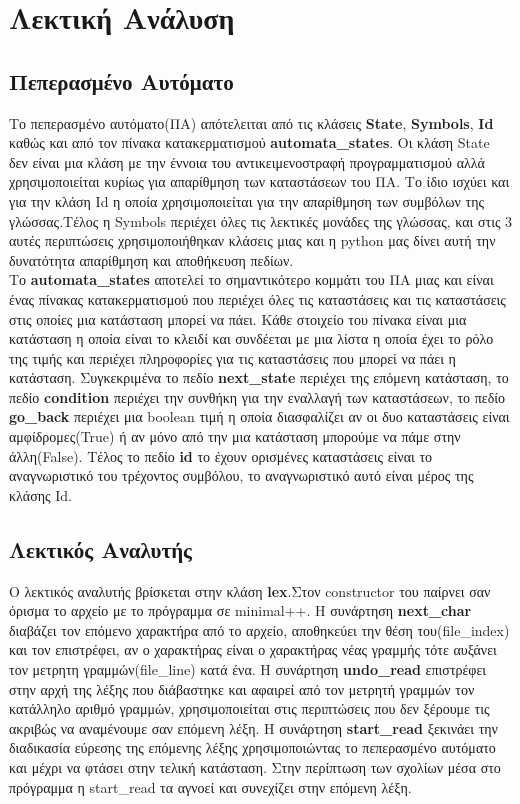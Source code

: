 \documentclass[12pt,a4paper,a4paper]{report}
\begin{document}
\chapter{Λεκτική Ανάλυση}
\section{Πεπερασμένο Αυτόματο}
Το πεπερασμένο αυτόματο(ΠΑ) απότελειται από τις κλάσεις \textbf{State}, \textbf{Symbols}, \textbf{Id} καθώς και από τον  πίνακα κατακερματισμού \newline \textbf{automata\_states}. Oι κλάση State δεν είναι μια κλάση με την έννοια του αντικειμενοστραφή προγραμματισμού αλλά χρησιμοποιείται κυρίως για απαρίθμηση των καταστάσεων του ΠΑ. Το ίδιο ισχύει και για την κλάση Id  η οποία χρησιμοποιείται για την απαρίθμηση των συμβόλων της γλώσσας.Τέλος η Symbols περιέχει όλες τις λεκτικές μονάδες της γλώσσας, και στις 3 αυτές περιπτώσεις χρησιμοποιήθηκαν κλάσεις μιας και η python μας δίνει αυτή την δυνατότητα απαρίθμηση και αποθήκευση πεδίων.\\
Το \textbf{automata\_states} αποτελεί το σημαντικότερο κομμάτι του ΠΑ μιας και είναι ένας πίνακας κατακερματισμού που περιέχει όλες τις καταστάσεις και τις καταστάσεις στις οποίες μια κατάσταση μπορεί να πάει. Κάθε στοιχείο του πίνακα είναι μια κατάσταση η οποία είναι το κλειδί και συνδέεται με μια λίστα η οποία έχει το ρόλο της τιμής και περιέχει πληροφορίες για τις καταστάσεις που μπορεί να πάει η κατάσταση. Συγκεκριμένα το πεδίο \textbf{next\_state} περιέχει της επόμενη κατάσταση, το πεδίο \textbf{condition} περιέχει την συνθήκη για την εναλλαγή των καταστάσεων, το πεδίο \textbf{go\_back} περιέχει μια boolean τιμή η οποία διασφαλίζει αν  οι δυο καταστάσεις είναι αμφίδρομες(True)  ή αν μόνο από την μια κατάσταση μπορούμε να πάμε στην άλλη(False). Tέλος το πεδίο \textbf{id} το έχουν  ορισμένες καταστάσεις είναι το αναγνωριστικό του τρέχοντος συμβόλου, το αναγνωριστικό αυτό είναι μέρος της κλάσης Ιd.\\

\section{Λεκτικός Αναλυτής}
O λεκτικός αναλυτής βρίσκεται στην κλάση \textbf{lex}.Στον constructor του παίρνει σαν όρισμα το αρχείο με το πρόγραμμα σε minimal++. Η συνάρτηση \textbf{next\_char} διαβάζει τον επόμενο χαρακτήρα από το αρχείο, αποθηκεύει την θέση του(file\_index) και τον επιστρέφει, αν ο χαρακτήρας είναι ο χαρακτήρας νέας γραμμής τότε αυξάνει τον μετρητη γραμμών(file\_line) κατά ένα. Η συνάρτηση \textbf{undo\_read} επιστρέφει στην αρχή της λέξης που διάβαστηκε και αφαιρεί από τον μετρητή γραμμών τον κατάλληλο αριθμό γραμμών, χρησιμοποιείται στις περιπτώσεις που δεν ξέρουμε τις ακριβώς να αναμένουμε σαν επόμενη λέξη. Η συνάρτηση \textbf{start\_read} ξεκινάει την διαδικασία εύρεσης της επόμενης λέξης χρησιμοποιώντας το πεπερασμένο αυτόματο και μέχρι να φτάσει στην τελική κατάσταση. Στην περίπτωση των σχολίων μέσα στο πρόγραμμα η start\_read τα αγνοεί  και συνεχίζει στην επόμενη λέξη.\\
\end{document}

